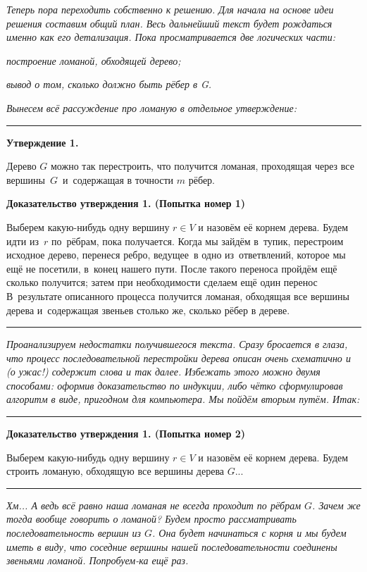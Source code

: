 \documentclass[a4paper,12pt]{article}
\begin{document}
\emph{
Теперь пора переходить собственно к решению. Для начала на основе идеи решения составим общий план. Весь дальнейший текст будет рождаться именно как его детализация. Пока просматривается две логических части:
}
\begin{items}{-3}
\item
\emph{построение ломаной, обходящей дерево;}
\item
\emph{вывод о том, сколько должно быть рёбер в G.}
\end{items}
\emph{
Вынесем всё рассуждение про ломаную в отдельное утверждение:
}

\bigskip
\hrule
\medskip
{\bf Утверждение 1.}

Дерево $G$ можно так  перестроить, что получится ломаная, проходящая через все вершины~$G$~и~содержащая в точности $m$ рёбер.

{\bf Доказательство утверждения 1. (Попытка номер 1)}

Выберем какую-нибудь одну вершину $r \in V$ и назовём её корнем дерева. Будем идти из~$r$ по~рёбрам, пока получается. Когда мы зайдём в~тупик, перестроим исходное дерево, перенеся ребро, ведущее~в одно из~ответвлений, которое мы ещё не посетили, в~конец нашего пути. После такого переноса пройдём ещё сколько получится; затем при необходимости сделаем ещё один перенос  В~результате описанного процесса получится ломаная, обходящая все вершины дерева и~содержащая звеньев столько же, сколько рёбер в дереве.

\medskip
\hrule
\bigskip

\emph{
Проанализируем недостатки получившегося текста. Сразу бросается в глаза, что процесс последовательной перестройки дерева описан очень схематично и (о ужас!) содержит слова  и так далее. Избежать этого можно двумя способами: оформив доказательство по индукции, либо чётко сформулировав алгоритм в виде, пригодном для компьютера. Мы пойдём вторым путём. Итак:
}

\bigskip
\hrule
\medskip
{\bf Доказательство утверждения 1. (Попытка номер 2)}

Выберем какую-нибудь одну вершину $r \in V$ и назовём её корнем дерева. Будем строить ломаную, обходящую все вершины дерева $G$...

\medskip
\hrule
\bigskip
\emph{
Хм... А ведь всё равно наша ломаная не всегда проходит по рёбрам $G$. Зачем же тогда вообще говорить о ломаной? Будем просто рассматривать последовательность вершин из $G$. Она будет начинаться с корня и мы будем иметь в виду, что соседние вершины нашей последовательности соединены звеньями ломаной. Попробуем-ка ещё раз.
}
\end{document}
